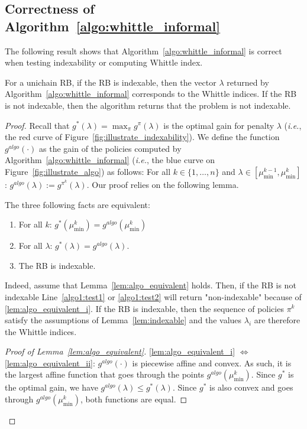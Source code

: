 \documentclass[acmsmall,screen,anonymous]{acmart}
\begin{document}
\subsection{Correctness of Algorithm~\ref{algo:whittle_informal}}

The following result shows that Algorithm~\ref{algo:whittle_informal} is correct when testing indexability or computing Whittle index.
\begin{thm}
    \label{thm:thm1}
    For a unichain RB, if the RB is indexable, then the vector $\lambda$ returned by Algorithm~\ref{algo:whittle_informal} corresponds to the Whittle indices. If the RB is not indexable, then the algorithm returns that the problem is not indexable. 
\end{thm}

\begin{proof}
    Recall that $g^{*}(\lambda)=\max_{\pi} g^\pi(\lambda)$ is the optimal gain for penalty $\lambda$ (\emph{i.e.}, the red curve of Figure~\ref{fig:illustrate_indexability}). We define the function $g^{algo}(\cdot)$ as the gain of the policies computed by Algorithm~\ref{algo:whittle_informal} (\emph{i.e.}, the blue curve on Figure~\ref{fig:illustrate_algo}) as follows: For all $k\in\{1,\dots, n\}$ and $\lambda\in[\mu^{k-1}_{\min},\mu^{k}_{\min}]$: $g^{algo}(\lambda) := g^{\pi^k}(\lambda)$. Our proof relies on the following lemma.
    \begin{lemma}
        \label{lem:algo_equivalent}
        The three following facts are equivalent:
        \begin{enumerate}[label=(\roman*)]
            \item \label{lem:algo_equivalent_i} For all $k$: $g^{*}(\mu^k_{\min})=g^{algo}(\mu^k_{\min})$
            \item \label{lem:algo_equivalent_ii} For all $\lambda$: $g^{*}(\lambda)=g^{algo}(\lambda)$.
            \item \label{lem:algo_equivalent_iii} The RB is indexable.
        \end{enumerate}
    \end{lemma}
    Indeed, assume that Lemma~\ref{lem:algo_equivalent} holds. Then, if the RB is not indexable Line~\ref{algo1:test1} or \ref{algo1:test2} will return "non-indexable" because of \ref{lem:algo_equivalent_i}. If the RB is indexable, then the sequence of policies $\pi^k$ satisfy the assumptions of Lemma~\ref{lem:indexable} and the values $\lambda_i$ are therefore the Whittle indices.

    \begin{proof}[Proof of Lemma~\ref{lem:algo_equivalent}] 
        \ref{lem:algo_equivalent_i} $\Leftrightarrow$ \ref{lem:algo_equivalent_ii}: $g^{algo}(\cdot)$ is piecewise affine and convex. As such, it is the largest affine function that goes through the points $g^{algo}(\mu^k_{\min})$. Since $g^*$ is the optimal gain, we have $g^{algo}(\lambda)\le g^{*}(\lambda)$. Since $g^*$ is also convex and goes through $g^{algo}(\mu^k_{\min})$, both functions are equal.
     

\end{proof}
\end{proof}
\end{document}
